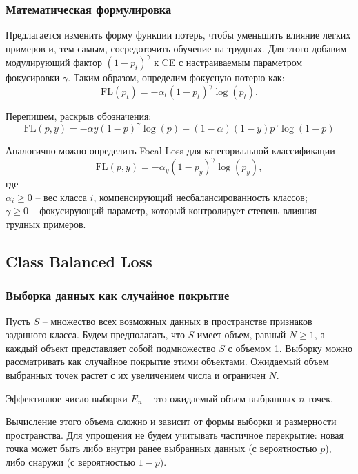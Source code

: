 \subsubsection*{Математическая формулировка}

Предлагается изменить форму функции потерь, чтобы уменьшить влияние легких примеров и, тем самым, сосредоточить обучение на трудных. Для этого добавим модулирующий фактор $(1-p_t)^\gamma$ к CE с настраиваемым параметром фокусировки $\gamma$. Таким образом, определим фокусную потерю как:
\[
    \text{FL}(p_t)=-\alpha_t(1-p_t)^\gamma\log(p_t).
\]

Перепишем, раскрыв обозначения:
\[ 
    \text{FL}(p, y) = -\alpha y(1 - p)^{\gamma} \log(p) - (1 - \alpha)(1 - y) p^{\gamma} \log(1 - p) 
\] 

Аналогично можно определить Focal Loss для категориальной классификации
\[
    \text{FL}(p,y)=-\alpha_y (1-p_y)^\gamma\log(p_y),
\]
где
\\\indent $\alpha_i \ge 0$ -- вес класса $i$, компенсирующий несбалансированность классов;
\\\indent $\gamma \ge 0$ -- фокусирующий параметр, который контролирует степень влияния трудных примеров.

\subsection*{Class Balanced Loss}

\subsubsection*{Выборка данных как случайное покрытие}

Пусть $S$ -- множество всех возможных данных в пространстве признаков заданного класса. Будем предполагать, что 
$S$ имеет объем, равный $N\ge1$, а каждый объект представляет собой подмножество $S$ с объемом 1. Выборку можно рассматривать как случайное покрытие этими объектами. Ожидаемый объем выбранных точек растет с их увеличением числа и ограничен $N$. 

\begin{definition}
    Эффективное число выборки $E_n$ -- это ожидаемый объем выбранных $n$ точек.
\end{definition}

Вычисление этого объема сложно и зависит от формы выборки и размерности пространства. Для упрощения не будем учитывать частичное перекрытие: новая точка может быть либо внутри ранее выбранных данных (с вероятностью $p$), либо снаружи (с вероятностью $1-p$).

